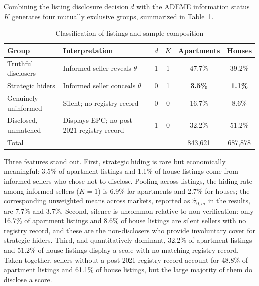\documentclass[10pt,letterpaper]{bp-template-concise}
\begin{document}
Combining the listing disclosure decision $d$ with the ADEME information status $K$ generates four mutually exclusive groups, summarized in Table~\ref{tab:groups}.

\begin{table}[H]
\centering
\caption{Classification of listings and sample composition}
\label{tab:groups}
\small\renewcommand{\arraystretch}{1.3}
\begin{tabular}{llcccc}
\toprule\toprule
\textbf{Group} & \textbf{Interpretation} & $d$ & $K$ & \textbf{Apartments} & \textbf{Houses} \\
\midrule
Truthful disclosers  & Informed seller reveals $\theta$        & 1 & 1 & 47.7\% & 39.2\% \\
Strategic hiders     & Informed seller conceals $\theta$     & 0 & 1 & \textbf{3.5\%}  & \textbf{1.1\%}  \\
Genuinely uninformed & Silent; no registry record              & 0 & 0 & 16.7\% & 8.6\% \\
Disclosed, unmatched & Displays EPC; no post-2021 registry record & 1 & 0 & 32.2\% & 51.2\% \\
\midrule
Total                &                                         &   &   & 843,621 & 687,878 \\
\bottomrule\bottomrule
\end{tabular}
\end{table}

\noindent Three features stand out. First, strategic hiding is rare but economically meaningful: 3.5\% of apartment listings and 1.1\% of house listings come from informed sellers who chose not to disclose. Pooling across listings, the hiding rate among informed sellers ($K=1$) is 6.9\% for apartments and 2.7\% for houses; the corresponding unweighted means across markets, reported as $\hat\sigma_{0,m}$ in the results, are 7.7\% and 3.7\%. Second, silence is uncommon relative to non-verification: only 16.7\% of apartment listings and 8.6\% of house listings are silent sellers with no registry record, and these are the non-disclosers who provide involuntary cover for strategic hiders. Third, and quantitatively dominant, 32.2\% of apartment listings and 51.2\% of house listings display a score with no matching registry record. Taken together, sellers without a post-2021 registry record account for 48.8\% of apartment listings and 61.1\% of house listings, but the large majority of them do disclose a score.

\end{document}
